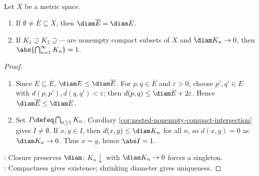 \begin{theorem} \label{thm:nested-compact-diameters-singleton} \\
Let $X$ be a metric space.
\begin{enumerate}[label=(\roman*)]
\setlength{\itemsep}{0pt}
\item If $\emptyset\ne E\subseteq X$, then $\diam\overline{E}=\diam E$.
\item If $K_1\supseteq K_2\supseteq\cdots$ are nonempty compact subsets of $X$ and $\diam K_n\to0$, then $\abs{\bigcap_{n=1}^{\infty}K_n}=1$.
\end{enumerate}
\begin{proof}
\begin{enumerate}[label=(\roman*)]
\setlength{\itemsep}{0pt}
\item Since $E\subseteq\overline{E}$, $\diam E\leq\diam\overline{E}$. For $p,q\in\overline{E}$ and $\varepsilon>0$, choose $p',q'\in E$ with $d(p,p'),d(q,q')<\varepsilon$; then $d(p,q)\leq\diam E+2\varepsilon$. Hence $\diam\overline{E}\leq\diam E$.
\item Set $I\defeq\bigcap_{n\geq1}K_n$. Corollary \ref{cor:nested-nonempty-compact-intersection} gives $I\ne\emptyset$. If $x,y\in I$, then $d(x,y)\leq\diam K_n$ for all $n$, so $d(x,y)=0$ as $\diam K_n\to0$. Thus $x=y$, hence $\abs I=1$.
\end{enumerate}
: Closure preserves $\diam$; $K_n\downarrow$ with $\diam K_n\to0$ forces a singleton.\\
: Compactness gives existence; shrinking diameter gives uniqueness.
\end{proof}
\end{theorem}

